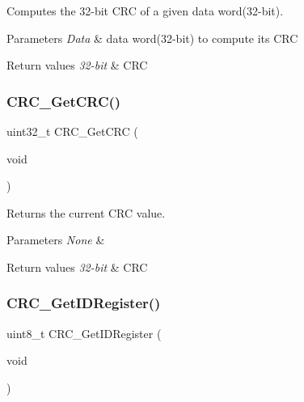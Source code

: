 Computes the 32-\/bit C\+RC of a given data word(32-\/bit). 


\begin{DoxyParams}{Parameters}
{\em Data} & data word(32-\/bit) to compute its C\+RC \\
\hline
\end{DoxyParams}

\begin{DoxyRetVals}{Return values}
{\em 32-\/bit} & C\+RC \\
\hline
\end{DoxyRetVals}
\mbox{\label{group___c_r_c___exported___functions_gab62db4561b0558f3c8ed53887fe7de8b}} 
\subsubsection{\texorpdfstring{CRC\_GetCRC()}{CRC\_GetCRC()}}
{\footnotesize\ttfamily uint32\+\_\+t C\+R\+C\+\_\+\+Get\+C\+RC (\begin{DoxyParamCaption}\item[{void}]{ }\end{DoxyParamCaption})}



Returns the current C\+RC value. 


\begin{DoxyParams}{Parameters}
{\em None} & \\
\hline
\end{DoxyParams}

\begin{DoxyRetVals}{Return values}
{\em 32-\/bit} & C\+RC \\
\hline
\end{DoxyRetVals}
\mbox{\label{group___c_r_c___exported___functions_gaf869f6e9c3ca0ae0822cfad1abea7e5f}} 
\subsubsection{\texorpdfstring{CRC\_GetIDRegister()}{CRC\_GetIDRegister()}}
{\footnotesize\ttfamily uint8\+\_\+t C\+R\+C\+\_\+\+Get\+I\+D\+Register (\begin{DoxyParamCaption}\item[{void}]{ }\end{DoxyParamCaption})}



